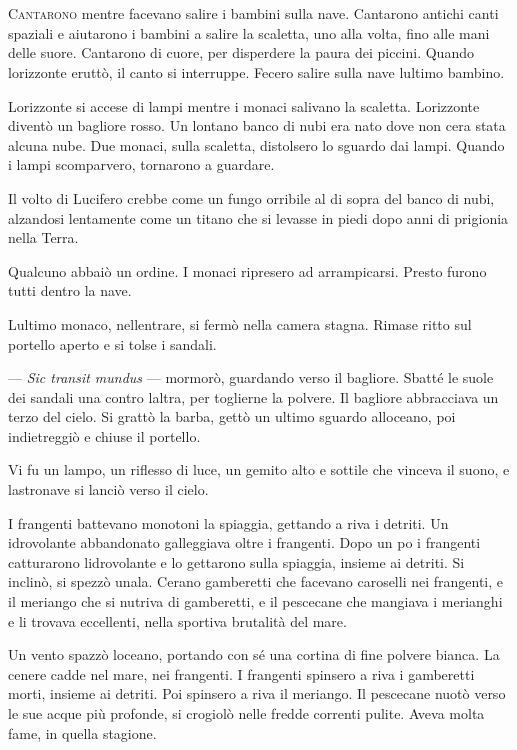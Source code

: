 	\chapter{\phantom{text}}

\lettrine{C}{antarono} mentre facevano salire i bambini sulla nave. Cantarono antichi
canti spaziali e aiutarono i bambini a salire la scaletta, uno alla
volta, fino alle mani delle suore. Cantarono di cuore, per disperdere la
paura dei piccini. Quando l\textquotesingle orizzonte eruttò, il canto
si interruppe. Fecero salire sulla nave l\textquotesingle ultimo
bambino.

L\textquotesingle orizzonte si accese di lampi mentre i monaci salivano
la scaletta. L\textquotesingle orizzonte diventò un bagliore rosso. Un
lontano banco di nubi era nato dove non c\textquotesingle era stata
alcuna nube. Due monaci, sulla scaletta, distolsero lo sguardo dai
lampi. Quando i lampi scomparvero, tornarono a guardare.

Il volto di Lucifero crebbe come un fungo orribile al di sopra del banco
di nubi, alzandosi lentamente come un titano che si levasse in piedi
dopo anni di prigionia nella Terra.

Qualcuno abbaiò un ordine. I monaci ripresero ad arrampicarsi. Presto
furono tutti dentro la nave.

L\textquotesingle ultimo monaco, nell\textquotesingle entrare, si fermò
nella camera stagna. Rimase ritto sul portello aperto e si tolse i
sandali.

--- \emph{Sic transit mundus} --- mormorò, guardando verso il bagliore.
Sbatté le suole dei sandali una contro l\textquotesingle altra, per
toglierne la polvere. Il bagliore abbracciava un terzo del cielo. Si
grattò la barba, gettò un ultimo sguardo all\textquotesingle oceano, poi
indietreggiò e chiuse il portello.

Vi fu un lampo, un riflesso di luce, un gemito alto e sottile che
vinceva il suono, e l\textquotesingle astronave si lanciò verso il
cielo.

I frangenti battevano monotoni la spiaggia, gettando a riva i detriti.
Un idrovolante abbandonato galleggiava oltre i frangenti. Dopo un
po\textquotesingle{} i frangenti catturarono
l\textquotesingle idrovolante e lo gettarono sulla spiaggia, insieme ai
detriti. Si inclinò, si spezzò un\textquotesingle ala.
C\textquotesingle erano gamberetti che facevano caroselli nei frangenti,
e il meriango che si nutriva di gamberetti, e il pescecane che mangiava
i merianghi e li trovava eccellenti, nella sportiva brutalità del mare.

Un vento spazzò l\textquotesingle oceano, portando con sé una cortina di
fine polvere bianca. La cenere cadde nel mare, nei frangenti. I
frangenti spinsero a riva i gamberetti morti, insieme ai detriti. Poi
spinsero a riva il meriango. Il pescecane nuotò verso le sue acque più
profonde, si crogiolò nelle fredde correnti pulite. Aveva molta fame, in
quella stagione.
\afterpage{\blankpage}
